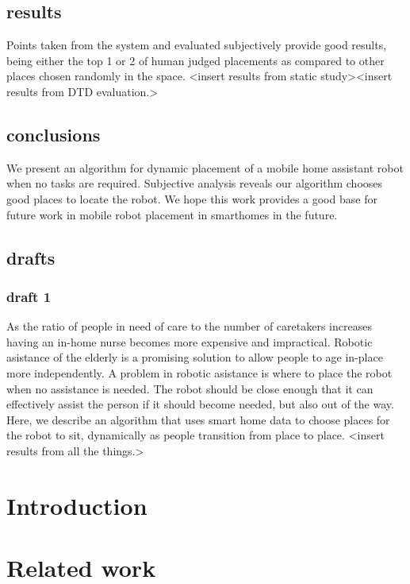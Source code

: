 \documentclass[11pt, conference, a4paper]{IEEEtran}
\begin{document}
\subsection{results}
Points taken from the system and evaluated subjectively provide good results, 
being either the top 1 or 2 of human judged placements as compared to other 
places chosen randomly in the space. \textless insert results from static 
study\textgreater \textless insert results from DTD evaluation.\textgreater

\subsection{conclusions}
We present an algorithm for dynamic placement of a mobile home assistant robot 
when no tasks are required. Subjective analysis reveals our algorithm chooses 
good places to locate the robot. We hope this work provides a good base for 
future work in mobile robot placement in smarthomes in the future.

\subsection{drafts}
\subsubsection{draft 1}
As the ratio of people in need of care to the number of caretakers increases 
having an in-home nurse becomes more expensive and impractical. Robotic 
asistance of the elderly is a promising solution to allow people to age 
in-place more independently. A problem in robotic asistance is where to place 
the robot when no assistance is needed. The robot should be close enough that 
it can effectively assist the person if it should become needed, but also out 
of the way. Here, we describe an algorithm that uses smart home data to choose 
places for the robot to sit, dynamically as people transition from place to 
place. \textless insert results from all the things.\textgreater


\section{Introduction}




\section{Related work}
\end{document}
